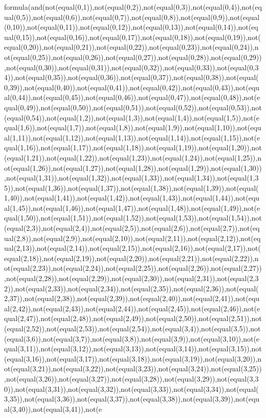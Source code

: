 formula(and(not(equal(0,1)),not(equal(0,2)),not(equal(0,3)),not(equal(0,4)),not(equal(0,5)),not(equal(0,6)),not(equal(0,7)),not(equal(0,8)),not(equal(0,9)),not(equal(0,10)),not(equal(0,11)),not(equal(0,12)),not(equal(0,13)),not(equal(0,14)),not(equal(0,15)),not(equal(0,16)),not(equal(0,17)),not(equal(0,18)),not(equal(0,19)),not(equal(0,20)),not(equal(0,21)),not(equal(0,22)),not(equal(0,23)),not(equal(0,24)),not(equal(0,25)),not(equal(0,26)),not(equal(0,27)),not(equal(0,28)),not(equal(0,29)),not(equal(0,30)),not(equal(0,31)),not(equal(0,32)),not(equal(0,33)),not(equal(0,34)),not(equal(0,35)),not(equal(0,36)),not(equal(0,37)),not(equal(0,38)),not(equal(0,39)),not(equal(0,40)),not(equal(0,41)),not(equal(0,42)),not(equal(0,43)),not(equal(0,44)),not(equal(0,45)),not(equal(0,46)),not(equal(0,47)),not(equal(0,48)),not(equal(0,49)),not(equal(0,50)),not(equal(0,51)),not(equal(0,52)),not(equal(0,53)),not(equal(0,54)),not(equal(1,2)),not(equal(1,3)),not(equal(1,4)),not(equal(1,5)),not(equal(1,6)),not(equal(1,7)),not(equal(1,8)),not(equal(1,9)),not(equal(1,10)),not(equal(1,11)),not(equal(1,12)),not(equal(1,13)),not(equal(1,14)),not(equal(1,15)),not(equal(1,16)),not(equal(1,17)),not(equal(1,18)),not(equal(1,19)),not(equal(1,20)),not(equal(1,21)),not(equal(1,22)),not(equal(1,23)),not(equal(1,24)),not(equal(1,25)),not(equal(1,26)),not(equal(1,27)),not(equal(1,28)),not(equal(1,29)),not(equal(1,30)),not(equal(1,31)),not(equal(1,32)),not(equal(1,33)),not(equal(1,34)),not(equal(1,35)),not(equal(1,36)),not(equal(1,37)),not(equal(1,38)),not(equal(1,39)),not(equal(1,40)),not(equal(1,41)),not(equal(1,42)),not(equal(1,43)),not(equal(1,44)),not(equal(1,45)),not(equal(1,46)),not(equal(1,47)),not(equal(1,48)),not(equal(1,49)),not(equal(1,50)),not(equal(1,51)),not(equal(1,52)),not(equal(1,53)),not(equal(1,54)),not(equal(2,3)),not(equal(2,4)),not(equal(2,5)),not(equal(2,6)),not(equal(2,7)),not(equal(2,8)),not(equal(2,9)),not(equal(2,10)),not(equal(2,11)),not(equal(2,12)),not(equal(2,13)),not(equal(2,14)),not(equal(2,15)),not(equal(2,16)),not(equal(2,17)),not(equal(2,18)),not(equal(2,19)),not(equal(2,20)),not(equal(2,21)),not(equal(2,22)),not(equal(2,23)),not(equal(2,24)),not(equal(2,25)),not(equal(2,26)),not(equal(2,27)),not(equal(2,28)),not(equal(2,29)),not(equal(2,30)),not(equal(2,31)),not(equal(2,32)),not(equal(2,33)),not(equal(2,34)),not(equal(2,35)),not(equal(2,36)),not(equal(2,37)),not(equal(2,38)),not(equal(2,39)),not(equal(2,40)),not(equal(2,41)),not(equal(2,42)),not(equal(2,43)),not(equal(2,44)),not(equal(2,45)),not(equal(2,46)),not(equal(2,47)),not(equal(2,48)),not(equal(2,49)),not(equal(2,50)),not(equal(2,51)),not(equal(2,52)),not(equal(2,53)),not(equal(2,54)),not(equal(3,4)),not(equal(3,5)),not(equal(3,6)),not(equal(3,7)),not(equal(3,8)),not(equal(3,9)),not(equal(3,10)),not(equal(3,11)),not(equal(3,12)),not(equal(3,13)),not(equal(3,14)),not(equal(3,15)),not(equal(3,16)),not(equal(3,17)),not(equal(3,18)),not(equal(3,19)),not(equal(3,20)),not(equal(3,21)),not(equal(3,22)),not(equal(3,23)),not(equal(3,24)),not(equal(3,25)),not(equal(3,26)),not(equal(3,27)),not(equal(3,28)),not(equal(3,29)),not(equal(3,30)),not(equal(3,31)),not(equal(3,32)),not(equal(3,33)),not(equal(3,34)),not(equal(3,35)),not(equal(3,36)),not(equal(3,37)),not(equal(3,38)),not(equal(3,39)),not(equal(3,40)),not(equal(3,41)),not(e